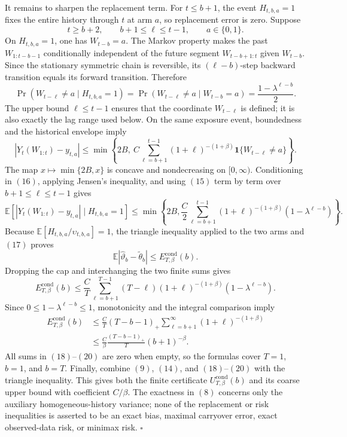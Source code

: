 It remains to sharpen the replacement term. For \(t\le b+1\), the event \(H_{t,b,a}=1\) fixes the entire history through \(t\) at arm \(a\), so replacement error is zero. Suppose
\[
t\ge b+2,\qquad b+1\le\ell\le t-1,\qquad a\in\{0,1\}.
\]
On \(H_{t,b,a}=1\), one has \(W_{t-b}=a\). The Markov property makes the past \(W_{1:t-b-1}\) conditionally independent of the future segment \(W_{t-b+1:t}\) given \(W_{t-b}\). Since the stationary symmetric chain is reversible, its \((\ell-b)\)-step backward transition equals its forward transition. Therefore
\[
\Pr(W_{t-\ell}\ne a\mid H_{t,b,a}=1)
=\Pr(W_{t-\ell}\ne a\mid W_{t-b}=a)
=\frac{1-\lambda^{\ell-b}}2.
\tag{15}
\]
The upper bound \(\ell\le t-1\) ensures that the coordinate \(W_{t-\ell}\) is defined; it is also exactly the lag range used below. On the same exposure event, boundedness and the historical envelope imply
\[
|Y_t(W_{1:t})-y_{t,a}|
\le \min\!\left\{2B,\ C\sum_{\ell=b+1}^{t-1}(1+\ell)^{-(1+\beta)}\mathbf1\{W_{t-\ell}\ne a\}\right\}.
\tag{16}
\]
The map \(x\mapsto\min\{2B,x\}\) is concave and nondecreasing on \([0,\infty)\). Conditioning in \((16)\), applying Jensen's inequality, and using \((15)\) term by term over \(b+1\le\ell\le t-1\) gives
\[
\mathbb E\!\left[|Y_t(W_{1:t})-y_{t,a}|\mid H_{t,b,a}=1\right]
\le\min\!\left\{2B,\frac C2\sum_{\ell=b+1}^{t-1}(1+\ell)^{-(1+\beta)}(1-\lambda^{\ell-b})\right\}.
\tag{17}
\]
Because \(\mathbb E[H_{t,b,a}/\upsilon_{t,b,a}]=1\), the triangle inequality applied to the two arms and \((17)\) proves
\[
\mathbb E|\widehat\vartheta_b-\widetilde\theta_b|\le E_{T,\beta}^{\mathrm{cond}}(b).
\tag{18}
\]
Dropping the cap and interchanging the two finite sums gives
\[
E_{T,\beta}^{\mathrm{cond}}(b)
\le\frac CT\sum_{\ell=b+1}^{T-1}(T-\ell)(1+\ell)^{-(1+\beta)}(1-\lambda^{\ell-b}).
\tag{19}
\]
Since \(0\le1-\lambda^{\ell-b}\le1\), monotonicity and the integral comparison imply
\[
\begin{aligned}
E_{T,\beta}^{\mathrm{cond}}(b)
&\le\frac CT(T-b-1)_+\sum_{\ell=b+1}^{\infty}(1+\ell)^{-(1+\beta)}\\
&\le\frac C\beta\frac{(T-b-1)_+}{T}(b+1)^{-\beta}.
\end{aligned}
\tag{20}
\]
All sums in \((18)\)--\((20)\) are zero when empty, so the formulas cover \(T=1\), \(b=1\), and \(b=T\). Finally, combine \((9)\), \((14)\), and \((18)\)--\((20)\) with the triangle inequality. This gives both the finite certificate \(U_{T,\beta}^{\mathrm{cond}}(b)\) and its coarse upper bound with coefficient \(C/\beta\). The exactness in \((8)\) concerns only the auxiliary homogeneous-history variance; none of the replacement or risk inequalities is asserted to be an exact bias, maximal carryover error, exact observed-data risk, or minimax risk. \(\square\)